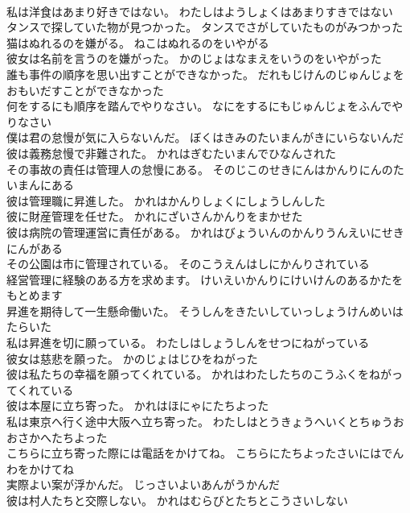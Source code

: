 \documentclass[8pt]{extreport}
\begin{document}
\begin{CJK}{UTF8}{min}
\\	私は洋食はあまり好きではない。	わたしはようしょくはあまりすきではない 
\\	タンスで探していた物が見つかった。	タンスでさがしていたものがみつかった 
\\	猫はぬれるのを嫌がる。	ねこはぬれるのをいやがる 
\\	彼女は名前を言うのを嫌がった。	かのじょはなまえをいうのをいやがった 
\\	誰も事件の順序を思い出すことができなかった。	だれもじけんのじゅんじょをおもいだすことができなかった 
\\	何をするにも順序を踏んでやりなさい。	なにをするにもじゅんじょをふんでやりなさい 
\\	僕は君の怠慢が気に入らないんだ。	ぼくはきみのたいまんがきにいらないんだ 
\\	彼は義務怠慢で非難された。	かれはぎむたいまんでひなんされた 
\\	その事故の責任は管理人の怠慢にある。	そのじこのせきにんはかんりにんのたいまんにある 
\\	彼は管理職に昇進した。	かれはかんりしょくにしょうしんした 
\\	彼に財産管理を任せた。	かれにざいさんかんりをまかせた 
\\	彼は病院の管理運営に責任がある。	かれはびょういんのかんりうんえいにせきにんがある 
\\	その公園は市に管理されている。	そのこうえんはしにかんりされている 
\\	経営管理に経験のある方を求めます。	けいえいかんりにけいけんのあるかたをもとめます 
\\	昇進を期待して一生懸命働いた。	そうしんをきたいしていっしょうけんめいはたらいた 
\\	私は昇進を切に願っている。	わたしはしょうしんをせつにねがっている 
\\	彼女は慈悲を願った。	かのじょはじひをねがった 
\\	彼は私たちの幸福を願ってくれている。	かれはわたしたちのこうふくをねがってくれている 
\\	彼は本屋に立ち寄った。	かれはほにゃにたちよった 
\\	私は東京へ行く途中大阪へ立ち寄った。	わたしはとうきょうへいくとちゅうおおさかへたちよった 
\\	こちらに立ち寄った際には電話をかけてね。	こちらにたちよったさいにはでんわをかけてね 
\\	実際よい案が浮かんだ。	じっさいよいあんがうかんだ 
\\	彼は村人たちと交際しない。	かれはむらびとたちとこうさいしない 

\end{CJK}
\end{document}
